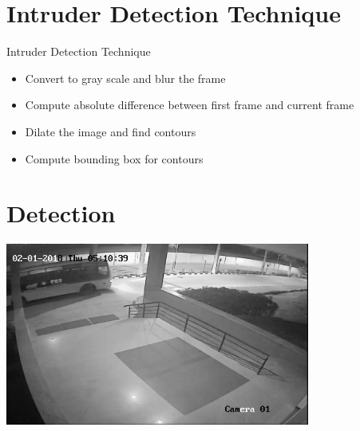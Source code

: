 \documentclass{beamer}
\begin{document}
\section{Intruder Detection Technique} 
\begin{frame}{Intruder Detection Technique}
  \begin{itemize}
   
    \item Convert to gray scale and blur the frame
    \newline
    \item Compute absolute difference between first frame and current frame
    \newline
    \item Dilate the image and find contours
    \newline
    \item Compute bounding box for contours
    \newline

  \end{itemize}
\end{frame}


\section{Detection}
\begin{frame}{}
  \begin{center}
    \includegraphics[width=10cm,keepaspectratio]{bus.png}
  \end{center}
\end{frame}

\end{document}
